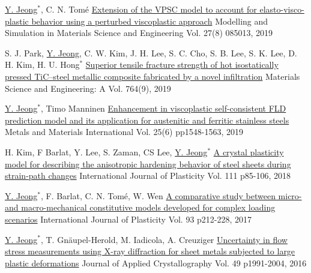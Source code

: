 \begin{cventries}
  \cventry
  {\underline{Y. Jeong}$^*$, C. N. Tom\'{e}}
  {\href{https://doi.org/10.1088/1361-651X/ab4b66}{Extension of the VPSC model to account for elasto-visco-plastic behavior using a perturbed viscoplastic approach}}
  {Modelling and Simulation in Materials Science and Engineering}
  {Vol. 27(8) 085013, 2019}
  {
  }

  \cventry
  {S. J. Park, \underline{Y. Jeong}, C. W. Kim, J. H. Lee, S. C. Cho, S. B. Lee, S. K. Lee, D. H. Kim, H. U. Hong$^*$}
  {\href{https://doi.org/10.1016/j.msea.2019.138260}{Superior tensile fracture strength of hot isostatically pressed TiC–steel metallic composite fabricated by a novel infiltration}}
  {Materials Science and Engineering: A}
  {Vol. 764(9), 2019}
  {
  }

  \cventry
  {\underline{Y. Jeong}$^*$, Timo Manninen}
  {\href{https://doi.org/10.1007/s12540-019-00292-5}{Enhancement in viscoplastic self-consistent FLD prediction model and its application for austenitic and ferritic stainless steels}}
  {Metals and Materials International}
  {Vol. 25(6) pp1548-1563, 2019}
  {
  }

  \cventry
  {H. Kim, F Barlat, Y. Lee, S. Zaman, CS Lee, \underline{Y. Jeong}$^*$}
  {\href{https://doi.org/10.1016/j.ijplas.2018.07.010}{A crystal plasticity model for describing the anisotropic hardening behavior of steel sheets during strain-path changes}}
  {International Journal of Plasticity}
  {Vol. 111 p85-106, 2018}
  {
  }

  \cventry
  {\underline{Y. Jeong}$^*$, F. Barlat, C. N. Tom\'{e}, W. Wen}
  {\href{http://dx.doi.org/10.1016/j.ijplas.2016.07.015}{A comparative study between micro- and macro-mechanical constitutive models developed for complex loading scenarios}}
  {International Journal of Plasticity}
  {Vol. 93 p212-228, 2017} %
  {
  }

  \cventry
  {\underline{Y. Jeong}$^*$, T. Gn\"{a}upel-Herold, M. Iadicola, A. Creuziger} %
  {\href{https://doi.org/10.1107/S1600576716013662}{Uncertainty in flow stress measurements using X-ray diffraction for sheet metals subjected to large plastic deformations}} %
  {Journal of Applied Crystallography} %
  {Vol. 49 p1991-2004, 2016} %
  {
  }


\end{cventries}

